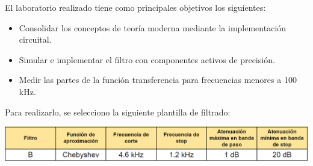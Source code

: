 \documentclass[main.tex]{subfiles}
\begin{document}
	
	El laboratorio realizado tiene como principales objetivos los siguientes:
	
	\begin{itemize}
		\item Consolidar los conceptos de teoría moderna mediante la implementación circuital.
		\item Simular e implementar el filtro con componentes activos de precisión.
		\item Medir las partes de la función transferencia para frecuencias menores a 100 kHz.
	\end{itemize}
	
	Para realizarlo, se selecciono la siguiente plantilla de filtrado:
	
	\bigskip
	
	\centering
	\includegraphics[width=15cm]{./../Imagenes/PlantillaConsigna.png}
	\raggedright
		
	
\end{document}
